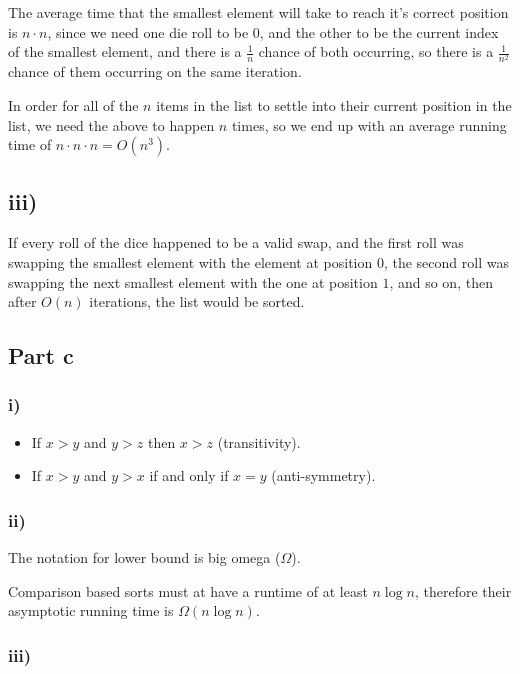 \documentclass{article}
\begin{document}
The average time that the smallest element will take to reach it's correct
position is $n \cdot n$, since we need one die roll to be 0, and the other to be
the current index of the smallest element, and there is a $\frac{1}{n}$ chance
of both occurring, so there is a $\frac{1}{n^2}$ chance of them occurring on the
same iteration.

In order for all of the $n$ items in the list to settle into their current
position in the list, we need the above to happen $n$ times, so we end up with
an average running time of $n \cdot n \cdot n = O(n^3)$.

\subsection*{iii)}

If every roll of the dice happened to be a valid swap, and the first roll was
swapping the smallest element with the element at position $0$, the second roll
was swapping the next smallest element with the one at position $1$, and so on,
then after $O(n)$ iterations, the list would be sorted.

\subsection*{Part c}

\subsubsection*{i)}

\begin{itemize}
  \item If $x > y$ and $y > z$ then $x > z$ (transitivity).
  \item If $x > y$ and $y > x$ if and only if $x = y$ (anti-symmetry).
\end{itemize}

\subsubsection*{ii)}

The notation for lower bound is big omega ($\Omega$).

Comparison based sorts must at have a runtime of at least $n \log n$, therefore
their asymptotic running time is $\Omega(n \log n)$.

\subsubsection*{iii)}
\end{document}
